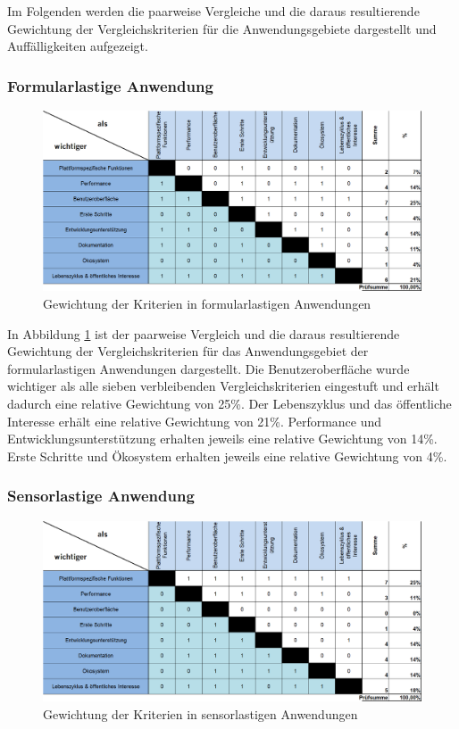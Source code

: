 \documentclass[]{lni}
\begin{document}
Im Folgenden werden die paarweise Vergleiche und die daraus resultierende Gewichtung der Vergleichskriterien für die Anwendungsgebiete dargestellt und Auffälligkeiten aufgezeigt.

\subsubsection{Formularlastige Anwendung}

\begin{figure}[h]
	\centering
	\includegraphics[width=0.85\linewidth]{images/GewichtungFormularlastig.png}
	\caption{Gewichtung der Kriterien in formularlastigen Anwendungen}
	\label{fig:weightFormula}
\end{figure}

In Abbildung \ref{fig:weightFormula} ist der paarweise Vergleich und die daraus resultierende Gewichtung der Vergleichskriterien für das Anwendungsgebiet der formularlastigen Anwendungen dargestellt. Die Benutzeroberfläche wurde wichtiger als alle sieben verbleibenden Vergleichskriterien eingestuft und erhält dadurch eine relative Gewichtung von 25\%. Der Lebenszyklus und das öffentliche Interesse erhält eine relative Gewichtung von 21\%. Performance und Entwicklungsunterstützung erhalten jeweils eine relative Gewichtung von 14\%. Erste Schritte und Ökosystem erhalten jeweils eine relative Gewichtung von 4\%.

\subsubsection{Sensorlastige Anwendung}

\begin{figure}[h]
	\centering
	\includegraphics[width=0.85\linewidth]{images/GewichtungSensorlastig.png}
	\caption{Gewichtung der Kriterien in sensorlastigen Anwendungen}
	\label{fig:weightSensor}
\end{figure}
\end{document}
